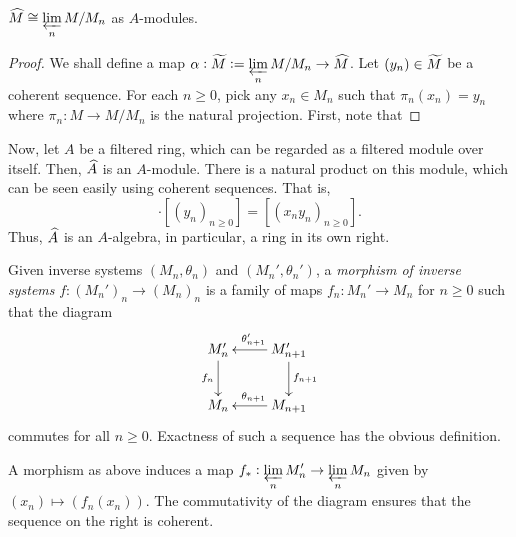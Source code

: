 \begin{proposition}
    $\displaystyle\widehat{M}\cong\varprojlim_n M/M_n$ as $A$-modules.
\end{proposition}
\begin{proof}
    We shall define a map $\displaystyle\alpha: \widetilde{M}:=\varprojlim_{n}M/M_n\to\widehat{M}$. Let $(y_n)\in\widetilde{M}$ be a coherent sequence. For each $n\ge 0$, pick any $x_n\in M_n$ such that $\pi_n(x_n) = y_n$ where $\pi_n: M\to M/M_n$ is the natural projection. First, note that 
\end{proof}

Now, let $A$ be a filtered ring, which can be regarded as a filtered module over itself. Then, $\widehat{A}$ is an $A$-module. There is a natural product on this module, which can be seen easily using coherent sequences. That is, 
\begin{equation*}
    [(x_n)_{n\ge 0}]\cdot[(y_n)_{n\ge 0}] = [(x_ny_n)_{n\ge 0}].
\end{equation*}
Thus, $\widehat{A}$ is an $A$-algebra, in particular, a ring in its own right.

\begin{definition}
    Given inverse systems $(M_n,\theta_n)$ and $(M_n',\theta_n')$, a \emph{morphism of inverse systems} $f: (M_n')_n\to (M_n)_n$ is a family of maps $f_n: M_n'\to M_n$ for $n\ge 0$ such that the diagram 
    \begin{equation*}
        \xymatrix {
            M_n'\ar[d]_{f_n} & M_{n + 1}'\ar[d]^{f_{n + 1}}\ar[l]_{\theta_{n + 1}'}\\
            M_n & M_{n + 1}\ar[l]_{\theta_{n + 1}}
        }
    \end{equation*}
    commutes for all $n\ge 0$. Exactness of such a sequence has the obvious definition.
\end{definition}

A morphism as above induces a map $\displaystyle f_\ast: \varprojlim_n M_n'\to\varprojlim_n M_n$ given by $(x_n)\mapsto (f_n(x_n))$. The commutativity of the diagram ensures that the sequence on the right is coherent.

